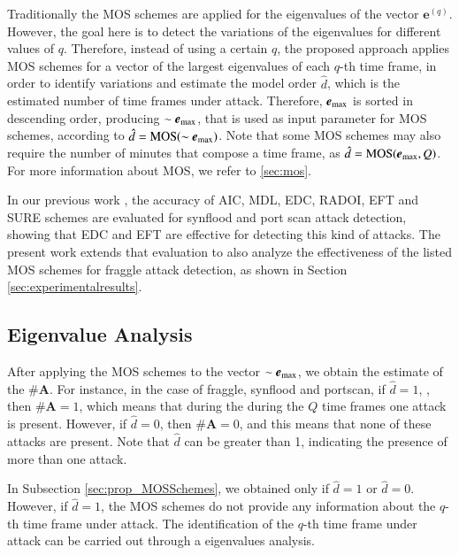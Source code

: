 \documentclass[review]{elsarticle}
\begin{document}
Traditionally the MOS schemes are applied for the eigenvalues of the vector $\boldsymbol{e}^{(q)}$. However, the goal here is to detect the variations of the eigenvalues for different values of $q$. Therefore, instead of using a certain $q$, the proposed approach applies MOS schemes for a vector of the largest eigenvalues of each $q$-th time frame, in order to identify variations and estimate the model order $\hat{d}$, which is the estimated number of time frames under attack. Therefore, $\boldsymbol{e}_{\rm max}$ is sorted in descending order, producing $\sim\boldsymbol{e}_{\rm max}$, that is used as input parameter for MOS schemes, according to $\hat{d} = \rm{MOS}(\sim\boldsymbol{e}_{\rm max})$. Note that some MOS schemes may also require the number of minutes that compose a time frame, as $\hat{d} = \rm{MOS}(\boldsymbol{e}_{\rm max},\emph{Q})$. For more information about MOS, we refer to \ref{sec:mos}.

In our previous work \cite{tenorio2013greatest}, the accuracy of AIC, MDL, EDC, RADOI, EFT and SURE schemes are evaluated for synflood and port scan attack detection, showing that EDC and EFT are effective for detecting this kind of attacks. The present work extends that evaluation to also analyze the effectiveness of the listed MOS schemes for fraggle attack detection, as shown in Section \ref{sec:experimentalresults}.

\subsection{Eigenvalue Analysis}
\label{sec:prop_EigenvalueAnalysis}

After applying the MOS schemes to the vector $\sim\boldsymbol{e}_{\rm max}$, we obtain the estimate of the $\#\boldsymbol{A}$. For instance, in the case of fraggle, synflood and portscan, if $\hat{d} = 1$, , then $\#\boldsymbol{A} = 1$, which means that during the during the $Q$ time frames one attack is present. However, if $\hat{d} = 0$, then $\#\boldsymbol{A} = 0$, and this means that none of these attacks are present. Note that $\hat{d}$ can be greater than 1, indicating the presence of more than one attack.

In Subsection \ref{sec:prop_MOSSchemes}, we obtained only if $\hat{d} = 1$ or $\hat{d} = 0$. However, if $\hat{d} = 1$, the MOS schemes do not provide any information about the $q$-th time frame under attack. The identification of the $q$-th time frame under attack can be carried out through a eigenvalues analysis.
\end{document}
